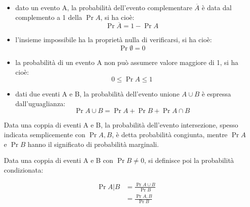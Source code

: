 \begin{itemize}
    \item dato un evento A, la probabilità dell'evento complementare $\overline{A}$ è data dal complemento a 1 della $\Pr{A}$, si ha cioè:
    {
        \Large 
        \begin{equation}
            \Pr{\overline{A} } = 1 - \Pr{A}
        \end{equation}
    }

    \item l'insieme impossibile ha la proprietà nulla di verificarsi, si ha cioè: 
    {   
        \Large 
        \begin{equation}
            \Pr{\emptyset} = 0    
        \end{equation}
    }

    \item la probabilità di un evento A non può assumere valore maggiore di 1, si ha cioè: 
    {
        \Large 
        \begin{equation}
            0 \leq \Pr{A} \leq 1
        \end{equation}
    } 

    \item dati due eventi A e B, la probabilità dell'evento unione $A \cup B$ è espressa dall'uguaglianza:
    {
        \Large 
        \begin{equation}
            \Pr{A \cup B} = \Pr{A} + \Pr{B} + \Pr{A \cap B}
        \end{equation}
    } 
\end{itemize}

Data una coppia di eventi A e B, la probabilità dell'evento intersezione, spesso indicata semplicemente con $\Pr{A, B}$, è detta probabilità congiunta, 
mentre $\Pr{A}$ e $\Pr{B}$ hanno il significato di probabilità marginali. \newline 

Data una coppia di eventi A e B con $\Pr{B} \neq 0$, si definisce poi la probabilità condizionata: 

{
    \Large 
    \begin{equation}
        \begin{split}
            \Pr{A | B} 
            &= 
            \frac{\Pr{A \cup B}}{\Pr{B}} 
            \\
            &= 
            \frac{\Pr{A, B}}{\Pr{B}}     
        \end{split}
    \end{equation}
} 

